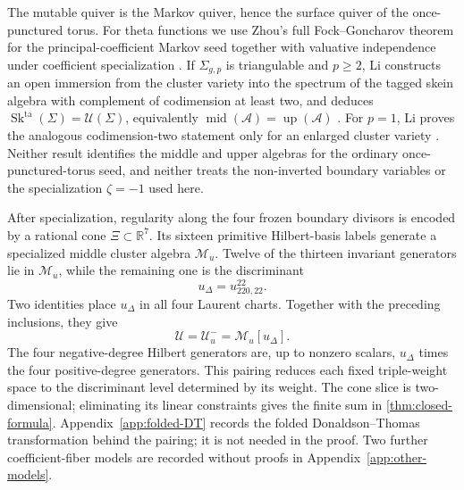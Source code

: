 \documentclass[11pt,reqno]{amsart}
\numberwithin{equation}{section}
\theoremstyle{remark}
\newcommand{\RR}{\mathbb{R}}
\newcommand{\cL}{\mathcal{L}}
\newcommand{\UR}{\mathscr U}
\newcommand{\Uneg}{\mathcal U_u^{-}}
\newcommand{\Mu}{\mathcal M_u}
\newcommand{\udisc}{u_{\Delta}}
\begin{document}
The mutable quiver is the Markov quiver, hence the surface quiver of the
once-punctured torus.  For theta functions we use Zhou's full Fock--Goncharov
theorem for the principal-coefficient Markov seed together with valuative
independence under coefficient specialization \cite{Zhou,CMMM}.  If
$\Sigma_{g,p}$ is triangulable and $p\ge2$, Li constructs an open
immersion from the cluster variety into the spectrum of the tagged skein
algebra with complement of codimension at least two, and deduces
$\operatorname{Sk}^{\mathrm{ta}}(\Sigma)=\mathcal U(\Sigma)$, equivalently
$\operatorname{mid}(\mathcal A)=\operatorname{up}(\mathcal A)$
\cite[Theorem~1.1(1) and Corollary~1.2]{Li}.  For $p=1$, Li proves the
analogous codimension-two statement only for an enlarged cluster variety
\cite[Theorem~1.1(2)]{Li}.  Neither result identifies the middle and upper
algebras for the ordinary once-punctured-torus seed, and neither treats the
non-inverted boundary variables or the specialization $\zeta=-1$ used
here.

After specialization, regularity along the four frozen boundary divisors is
encoded by a rational cone $\Xi\subset\RR^7$.  Its sixteen primitive
Hilbert-basis labels generate a specialized middle cluster algebra $\Mu$.
Twelve of the thirteen invariant generators lie in $\Mu$, while the
remaining one is the discriminant
\[ \udisc=u_{220,22}^{22}. \]
Two identities place $\udisc$ in all four Laurent charts.  Together with
the preceding inclusions, they give
\[ \UR=\Uneg=\Mu[\udisc]. \]
The four negative-degree Hilbert generators are, up to nonzero scalars,
$\udisc$ times the four positive-degree generators.  This pairing reduces
each fixed triple-weight space to the discriminant level determined by its
weight.  The cone slice is two-dimensional; eliminating its
linear constraints gives the finite sum in \cref{thm:closed-formula}.
Appendix~\ref{app:folded-DT} records the folded Donaldson--Thomas
transformation behind the pairing; it is not needed in the proof.  Two further
coefficient-fiber models are recorded without proofs in
Appendix~\ref{app:other-models}.
\end{document}
